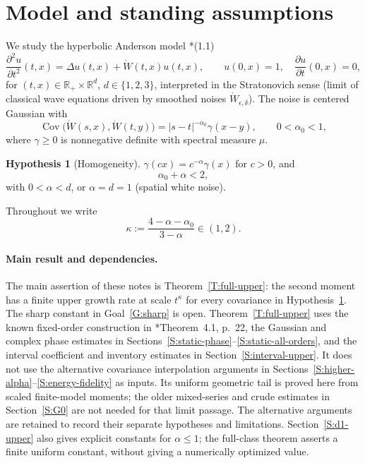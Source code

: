 \documentclass[12pt]{article}
\numberwithin{equation}{section}
\theoremstyle{definition}
\newtheorem{hypothesis}[theorem]{Hypothesis}
\newcommand{\R}{\mathbb{R}}
\newcommand{\W}{\dot W}
\begin{document}
\tableofcontents

\section{Model and standing assumptions}\label{S:model}

We study the hyperbolic Anderson model
\cite{chen:author2026:time-dependency}*{(1.1)}
\begin{equation}\label{E:HAM}
  \frac{\partial^2 u}{\partial t^2}(t,x)=\Delta u(t,x)+\W(t,x)u(t,x),
  \qquad u(0,x)=1,\quad \frac{\partial u}{\partial t}(0,x)=0,
\end{equation}
for $(t,x)\in\R_+\times\R^d$, $d\in\{1,2,3\}$, interpreted in the
Stratonovich sense (limit of classical wave equations driven by smoothed
noises $\W_{\epsilon,\delta}$). The noise is centered Gaussian with
\begin{equation}\label{E:cov}
  \operatorname{Cov}\big(\W(s,x),\W(t,y)\big)=|s-t|^{-\alpha_0}\gamma(x-y),
  \qquad 0<\alpha_0<1,
\end{equation}
where $\gamma\ge0$ is nonnegative definite with spectral measure $\mu$.

\begin{hypothesis}[Homogeneity]\label{H:homog}
  $\gamma(cx)=c^{-\alpha}\gamma(x)$ for $c>0$, and
  \begin{equation}\label{E:threshold}
    \alpha_0+\alpha<2,
  \end{equation}
  with $0<\alpha<d$, or $\alpha=d=1$ (spatial white noise).
\end{hypothesis}

Throughout we write
\begin{equation}\label{E:kappa}
  \kappa:=\frac{4-\alpha-\alpha_0}{3-\alpha}\in(1,2).
\end{equation}

\paragraph{Main result and dependencies.}
The main assertion of these notes is Theorem~\ref{T:full-upper}: the
second moment has a finite upper growth rate at scale $t^\kappa$ for
every covariance in Hypothesis~\ref{H:homog}. The sharp constant in
Goal~\ref{G:sharp} is open. Theorem~\ref{T:full-upper} uses the known fixed-order construction in
\cite{chen:author2026:time-dependency}*{Theorem~4.1, p.~22}, the Gaussian
and complex phase estimates in Sections~\ref{S:static-phase}--\ref{S:static-all-orders},
and the interval coefficient and inventory estimates in
Section~\ref{S:interval-upper}. It does not use the alternative covariance
interpolation arguments in Sections~\ref{S:higher-alpha}--\ref{S:energy-fidelity}
as inputs. Its uniform geometric tail is proved here from scaled finite-model
moments; the older mixed-series and crude estimates in
Section~\ref{S:G0} are not needed for that limit passage. The alternative
arguments are retained to record their separate hypotheses
and limitations. Section~\ref{S:d1-upper} also gives explicit constants for
$\alpha\le1$; the full-class theorem asserts a finite uniform constant,
without giving a numerically optimized value.
\end{document}
